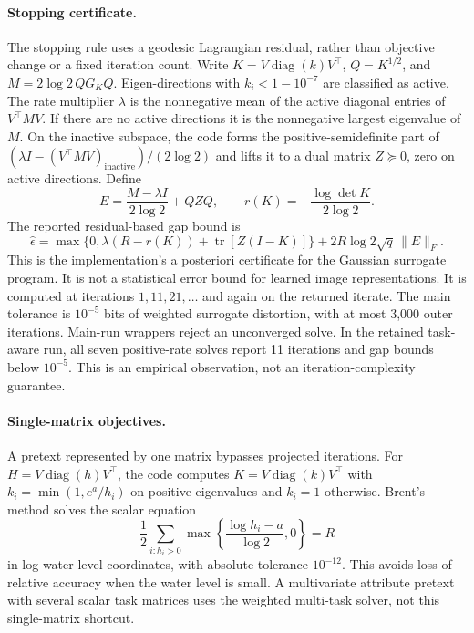 \paragraph{Stopping certificate.}
The stopping rule uses a geodesic Lagrangian residual, rather than objective
change or a fixed iteration count. Write $K=V\operatorname{diag}(k)V^\top$,
$Q=K^{1/2}$, and $M=2\log2\,QG_KQ$.
Eigen-directions with $k_i<1-10^{-7}$ are classified as active. The rate
multiplier $\lambda$ is the nonnegative mean of the active diagonal entries
of $V^\top MV$. If there are no active directions it is the nonnegative
largest eigenvalue of $M$. On the inactive subspace, the code forms the
positive-semidefinite part of
$(\lambda I-(V^\top MV)_{\mathrm{inactive}})/(2\log2)$
and lifts it to a dual matrix $Z\succeq0$, zero on active directions.
Define
\[
 E=\frac{M-\lambda I}{2\log2}+QZQ,
 \qquad r(K)=-\frac{\log\det K}{2\log2}.
\]
The reported residual-based gap bound is
\begin{equation}
 \widehat\epsilon=
 \max\{0,\lambda(R-r(K))+\operatorname{tr}[Z(I-K)]\}
 +2R\log2\sqrt q\,\|E\|_F.
 \label{eq:implemented-gap}
\end{equation}
This is the implementation's a posteriori certificate for the Gaussian
surrogate program. It is not a statistical error bound for learned image
representations. It is computed at iterations $1,11,21,\ldots$ and again
on the returned iterate. The main tolerance is $10^{-5}$ bits of weighted
surrogate distortion, with at most 3,000 outer iterations. Main-run wrappers
reject an unconverged solve. In the retained task-aware run, all seven
positive-rate solves report 11 iterations and gap bounds below $10^{-5}$.
This is an empirical observation, not an iteration-complexity guarantee.

\paragraph{Single-matrix objectives.}
A pretext represented by one matrix bypasses projected iterations.
For $H=V\operatorname{diag}(h)V^\top$, the code computes
$K=V\operatorname{diag}(k)V^\top$ with
$k_i=\min(1,e^a/h_i)$ on positive eigenvalues and $k_i=1$ otherwise.
Brent's method solves the scalar equation
\[
 \frac12\sum_{i:h_i>0}\max\left\{\frac{\log h_i-a}{\log2},0\right\}=R
\]
in log-water-level coordinates, with absolute tolerance $10^{-12}$.
This avoids loss of relative accuracy when the water level is small.
A multivariate attribute pretext with several scalar task matrices uses the
weighted multi-task solver, not this single-matrix shortcut.

